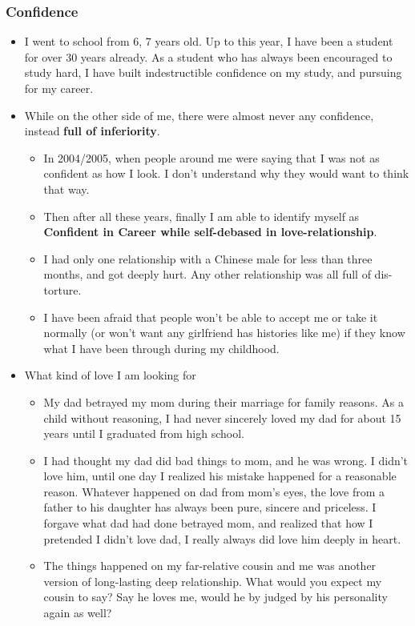 \documentclass[9pt,b5paper]{article}
\begin{document}
\subsubsection{Confidence}
\label{sec-9-2-1}
\begin{itemize}
\item I went to school from 6, 7 years old. Up to this year, I have been a student for over 30 years already. As a student who has always been encouraged to study hard, I have built indestructible confidence on my study, and pursuing for my career.
\item While on the other side of me, there were almost never any confidence, instead \textbf{full of inferiority}. 
\begin{itemize}
\item In 2004/2005, when people around me were saying that I was not as confident as how I look. I don't understand why they would want to think that way.
\item Then after all these years, finally I am able to identify myself as \textbf{Confident in Career while self-debased in love-relationship}.
\item I had only one relationship with a Chinese male for less than three months, and got deeply hurt. Any other relationship was all full of dis-torture.
\item I have been afraid that people won't be able to accept me or take it normally (or won't want any girlfriend has histories like me) if they know what I have been through during my childhood.
\end{itemize}
\item What kind of love I am looking for
\begin{itemize}
\item My dad betrayed my mom during their marriage for family reasons. As a child without reasoning, I had never sincerely loved my dad for about 15 years until I graduated from high school.
\item I had thought my dad did bad things to mom, and he was wrong. I didn't love him, until one day I realized his mistake happened for a reasonable reason. Whatever happened on dad from mom's eyes, the love from a father to his daughter has always been pure, sincere and priceless. I forgave what dad had done betrayed mom, and realized that how I pretended I didn't love dad, I really always did love him deeply in heart.
\item The things happened on my far-relative cousin and me was another version of long-lasting deep relationship. What would you expect my cousin to say? Say he loves me, would he by judged by his personality again as well?
\end{itemize}
\end{itemize}
\end{document}
